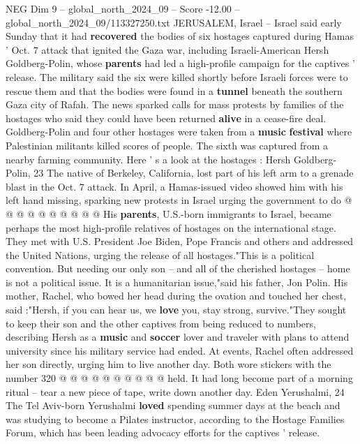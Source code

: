 \begin{textsample}{NEG Dim 9 – global\_north\_2024\_09 – Score -12.00 – global\_north\_2024\_09/113327250.txt}  \label{ex:f9_neg_005}
JERUSALEM, Israel -- Israel said early Sunday that it had \textbf{recovered} the bodies of six hostages captured during Hamas ' Oct. 7 attack that ignited the Gaza war, including Israeli-American Hersh Goldberg-Polin, whose \textbf{parents} had led a high-profile campaign for the captives ' release.
The military said the six were killed shortly before Israeli forces were to rescue them and that the bodies were found in a \textbf{tunnel} beneath the southern Gaza city of Rafah.
The news sparked calls for mass protests by families of the hostages who said they could have been returned \textbf{alive} in a cease-fire deal.
Goldberg-Polin and four other hostages were taken from a \textbf{music} \textbf{festival} where Palestinian militants killed scores of people.
The sixth was captured from a nearby farming community.
Here ' s a look at the hostages : Hersh Goldberg-Polin, 23 The native of Berkeley, California, lost part of his left arm to a grenade blast in the Oct. 7 attack.
In April, a Hamas-issued video showed him with his left hand missing, sparking new protests in Israel urging the government to do @ @ @ @ @ @ @ @ @ @ His \textbf{parents}, U.S.-born immigrants to Israel, became perhaps the most high-profile relatives of hostages on the international stage.
They met with U.S.
President Joe Biden, Pope Francis and others and addressed the United Nations, urging the release of all hostages."This is a political convention.
But needing our only son -- and all of the cherished hostages -- home is not a political issue.
It is a humanitarian issue,"said his father, Jon Polin.
His mother, Rachel, who bowed her head during the ovation and touched her chest, said :"Hersh, if you can hear us, we \textbf{love} you, stay strong, survive."They sought to keep their son and the other captives from being reduced to numbers, describing Hersh as a \textbf{music} and \textbf{soccer} lover and traveler with plans to attend university since his military service had ended.
At events, Rachel often addressed her son directly, urging him to live another day.
Both wore stickers with the number 320 @ @ @ @ @ @ @ @ @ @ held.
It had long become part of a morning ritual -- tear a new piece of tape, write down another day.
Eden Yerushalmi, 24 The Tel Aviv-born Yerushalmi \textbf{loved} spending summer days at the beach and was studying to become a Pilates instructor, according to the Hostage Families Forum, which has been leading advocacy efforts for the captives ' release.

\end{textsample}
